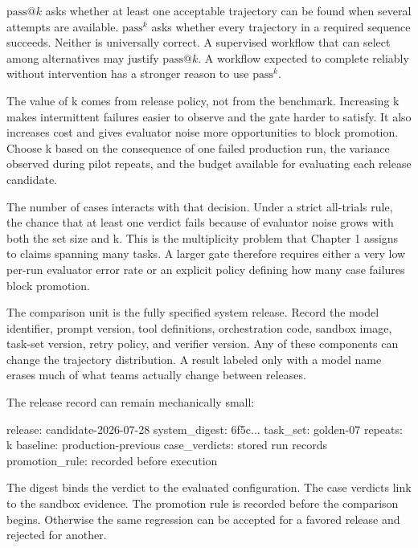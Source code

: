\(\mathrm{pass}@k\) asks whether at least one acceptable trajectory can be found when several attempts are available. \(\mathrm{pass}^{k}\) asks whether every trajectory in a required sequence succeeds. Neither is universally correct. A supervised workflow that can select among alternatives may justify \(\mathrm{pass}@k\). A workflow expected to complete reliably without intervention has a stronger reason to use \(\mathrm{pass}^{k}\).

The value of k comes from release policy, not from the benchmark. Increasing k makes intermittent failures easier to observe and the gate harder to satisfy. It also increases cost and gives evaluator noise more opportunities to block promotion. Choose k based on the consequence of one failed production run, the variance observed during pilot repeats, and the budget available for evaluating each release candidate.

The number of cases interacts with that decision. Under a strict all-trials rule, the chance that at least one verdict fails because of evaluator noise grows with both the set size and k. This is the multiplicity problem that Chapter 1 assigns to claims spanning many tasks. A larger gate therefore requires either a very low per-run evaluator error rate or an explicit policy defining how many case failures block promotion.

The comparison unit is the fully specified system release. Record the model identifier, prompt version, tool definitions, orchestration code, sandbox image, task-set version, retry policy, and verifier version. Any of these components can change the trajectory distribution. A result labeled only with a model name erases much of what teams actually change between releases.

The release record can remain mechanically small:

\begin{record}
\begin{recordbody}
release:         candidate-2026-07-28
system_digest:   6f5c...
task_set:        golden-07
repeats:         k
baseline:        production-previous
case_verdicts:   stored run records
promotion_rule:  recorded before execution
\end{recordbody}
\end{record}

The digest binds the verdict to the evaluated configuration. The case verdicts link to the sandbox evidence. The promotion rule is recorded before the comparison begins. Otherwise the same regression can be accepted for a favored release and rejected for another.

